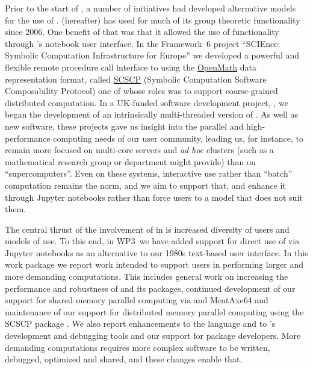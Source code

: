 Prior to the start of \ODK, a number of initiatives had developed
alternative models for the use of \GAP. \SageMath (\Sage hereafter)
has used \GAP for much of its group theoretic functionality since
2006. One benefit of that was that it allowed the use of \GAP
functionality through \Sage's notebook user interface. In the Framework~6 project
``SCIEnce: Symbolic Computation Infrastructure for Europe'' we
developed a powerful and flexible remote procedure call interface to
\GAP using the \href{https://www.openmath.org/}{OpenMath} data representation format, called
\href{https://www.openmath.org/standard/scscp/}{SCSCP}
(Symbolic Computation Software Composability Protocol) one of
whose roles was to support coarse-grained distributed computation. In
a UK-funded software development project, \HPCGAP, we began the
development of an intrinsically multi-threaded version of \GAP. As
well as new software, these projects gave us insight into the parallel
and high-performance computing needs of our user community, leading
us, for instance, to remain more focused on multi-core servers and
\textit{ad hoc} clusters (such as a mathematical research group or
department might provide) than on ``supercomputers''. Even on these
systems, interactive use rather than ``batch'' computation remains the
norm, and we aim to support that, and enhance it through Jupyter
notebooks rather than force users to a model that does not suit them.

The central thrust of the involvement of \GAP in \ODK is increased
diversity of users and models of use. To this end, in WP3~we have
added support for direct use of \GAP via Jupyter notebooks as an
alternative to our 1980s text-based user interface. In this work package we report
work intended to support \GAP users in performing larger and more
demanding computations. This includes general work on increasing the
performance and robustness of \GAP and its packages, continued
development of our support for shared memory parallel computing via
\HPCGAP and MeatAxe64 and maintenance of our support for distributed
memory parallel computing using the SCSCP package \cite{SCSCP}.
We also report enhancements to the \GAP language and to
\GAP's development and debugging tools and our support for package
developers. More demanding computations requires more complex software
to be written, debugged, optimized and shared, and these changes
enable that.

